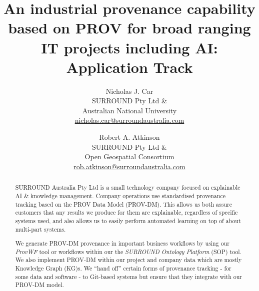 \documentclass[letterpaper,twocolumn,10pt]{article}
\begin{document}

\date{}

\title{\Large \bf An industrial provenance capability based on PROV for broad ranging IT projects including AI: Application Track}

\author{
{\rm Nicholas J. Car}\\
SURROUND Pty Ltd \&\\
Australian National University\\
\href{mailto:nicholas.car@surroundaustralia.com}{nicholas.car@surroundaustralia.com} 
\and
{\rm Robert A. Atkinson}\\
SURROUND Pty Ltd \&\\
Open Geospatial Consortium\\
\href{mailto:rob.atkinson@surroundaustralia.com}{rob.atkinson@surroundaustralia.com} 
} %

\maketitle

\begin{abstract}

SURROUND Australia Pty Ltd is a small technology company focused on explainable 
AI \& knowledge management. Company operations use 
standardised provenance tracking based on the PROV Data Model (PROV-DM). This
allows us both assure customers that any results 
we produce for them are explainable, regardless of specific systems used, 
and also allows us to easily perform automated learning on top of about multi-part systems.

We generate PROV-DM provenance in important business workflows by 
using our \textit{ProvWF} tool or workflows within our 
the \textit{SURROUND Ontology Platform} (SOP) tool. We also implement PROV-DM within our 
project and company data which are mostly Knowledge Graph (KG)s. We ``hand off'' certain
forms of provenance tracking - for some data and software - to Git-based systems but ensure 
that they integrate with our PROV-DM model.
\end{abstract}
\end{document}
